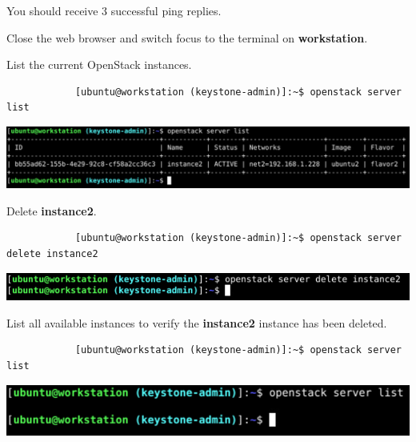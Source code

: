 \documentclass[letterpaper, 12pt]{article}
\begin{document}
\begin{enumerate}
    \begin{notebox}
        You should receive 3 successful ping replies.
    \end{notebox}

    \begin{labstep}
        Close the web browser and switch focus to the terminal on \textbf{workstation}.
    \end{labstep}

    \begin{labstep}
        List the current OpenStack instances.
        \begin{lstlisting}
            [ubuntu@workstation (keystone-admin)]:~$ openstack server list
        \end{lstlisting}

        \begin{center}
            \includegraphics[width=\linewidth]{images/part5/step12.png}
        \end{center}
    \end{labstep}

    \begin{labstep}
        Delete \textbf{instance2}.
        \begin{lstlisting}
            [ubuntu@workstation (keystone-admin)]:~$ openstack server delete instance2
        \end{lstlisting}

        \begin{center}
            \includegraphics[width=\linewidth]{images/part5/step13.png}
        \end{center}
    \end{labstep}

    \begin{labstep}
        List all available instances to verify the \textbf{instance2} instance has been deleted.
        \begin{lstlisting}
            [ubuntu@workstation (keystone-admin)]:~$ openstack server list
        \end{lstlisting}

        \begin{center}
            \includegraphics[width=\linewidth]{images/part5/step14.png}
        \end{center}
    \end{labstep}


\end{enumerate}
\end{document}
